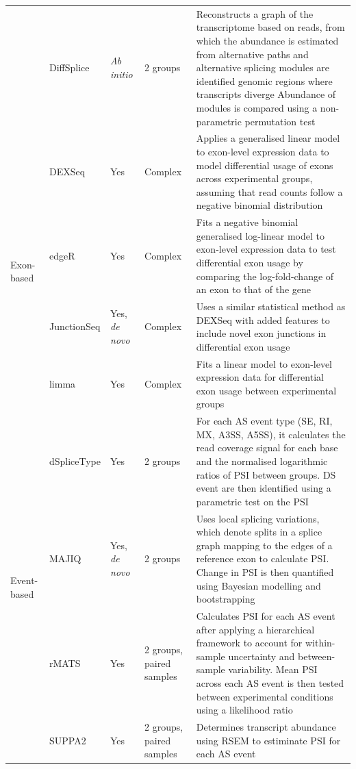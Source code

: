 \begin{landscape}
\begin{longtable}[c]{p{2.5cm}p{2cm}p{2cm}p{2.5cm}p{17cm}}
	&
	DiffSplice &
	\textit{Ab initio} &
	2 groups &
	\tabitem Reconstructs a graph of the transcriptome based on reads, from   which the abundance is estimated from alternative paths and alternative splicing modules are identified genomic regions where transcripts diverge \newline 
	\tabitem  Abundance of modules is compared using a non-parametric permutation test \\ \cmidrule(l){1-5} 
	\multirow{4}{*}{Exon-based} &
	DEXSeq &
	Yes &
	Complex &
	\tabitem Applies a generalised linear model to exon-level expression data to model differential usage of exons across experimental groups, assuming that read counts follow a negative binomial distribution \\ 		
	&
	edgeR &
	Yes &
	Complex &
	\tabitem Fits a negative binomial generalised log-linear model to exon-level expression data  to test differential exon usage by comparing the log-fold-change of an exon to that of the gene \\
	&
	JunctionSeq &
	Yes, \textit{de novo} &
	Complex &
	\tabitem Uses a similar statistical method as DEXSeq with added features to include novel exon junctions in differential exon usage \\	
	&
	limma &
	Yes &
	Complex &
	\tabitem Fits a linear model to exon-level expression data for differential exon usage between experimental groups \\ \cmidrule(l){1-5} 
	\multirow{4}{*}{Event-based} &
	dSpliceType &
	Yes &
	2 groups &
	\tabitem For each AS event type (SE, RI, MX, A3SS, A5SS), it calculates the read coverage signal for each base and the normalised  logarithmic ratios of PSI between groups. DS event are then identified using a parametric test on the PSI \\ 			
	& 
	MAJIQ &
	Yes, \textit{de novo} &
	2 groups &
	\tabitem Uses local splicing variations, which denote splits in a splice graph mapping to the edges of a reference exon to calculate PSI.   
	\tabitem Change in PSI is then quantified using Bayesian modelling and bootstrapping \\ 		

	&
	rMATS &
	Yes &
	2 groups, \newline paired samples &
	\tabitem Calculates PSI for each AS event after applying a hierarchical framework to account for within-sample uncertainty and between-sample variability.
	\tabitem Mean PSI across each AS event is then tested between experimental conditions using a likelihood ratio \\ 	
	&
	SUPPA2 &
	Yes &
	2 groups, \newline paired samples &
	\tabitem Determines transcript abundance using RSEM to estiminate PSI   for each AS event \\* \bottomrule 
	\end{longtable}
\end{landscape}
\restoregeometry

